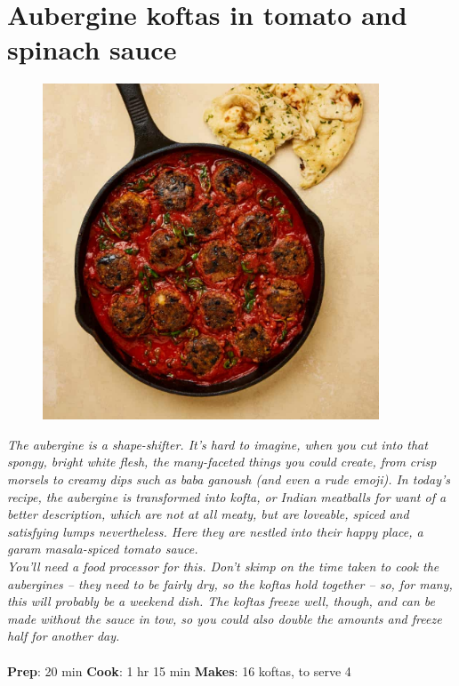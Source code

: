 \documentclass{book}
\begin{document}
\section{Aubergine koftas in tomato and spinach sauce}
\begin{figure}
\centering\includegraphics[width=10cm,height=10cm,keepaspectratio]{Recipe_Pictures/Aubergine_koftas_in_tomato_and_spinach_sauce.png}
\end{figure}
\emph{The aubergine is a shape-shifter. It’s hard to imagine, when you cut into that spongy, bright white flesh, the many-faceted things you could create, from crisp morsels to creamy dips such as baba ganoush (and even a rude emoji). In today’s recipe, the aubergine is transformed into kofta, or Indian meatballs for want of a better description, which are not at all meaty, but are loveable, spiced and satisfying lumps nevertheless. Here they are nestled into their happy place, a garam masala-spiced tomato sauce.\\ 
You’ll need a food processor for this. Don’t skimp on the time taken to cook the aubergines – they need to be fairly dry, so the koftas hold together – so, for many, this will probably be a weekend dish. The koftas freeze well, though, and can be made without the sauce in tow, so you could also double the amounts and freeze half for another day.}\\\\ 
\textbf{Prep}: 20 min
\textbf{Cook}: 1 hr 15 min
\textbf{Makes}: 16 koftas, to serve 4
\end{document}
